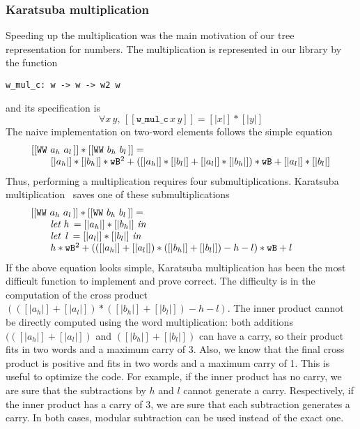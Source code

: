 \subsubsection{Karatsuba multiplication}
Speeding up the multiplication was the main motivation of our 
tree representation for numbers. The multiplication is represented in our library
by the function
\begin{verbatim}
w_mul_c: w -> w -> w2 w
\end{verbatim}
and its specification is
$$\forall x\, y,\, [[\texttt{w\_mul\_c}\, x\, y]] = [|x|] * [|y|]$$
The naive implementation on two-word elements follows the simple equation
$$\begin{array}{l}
[[\texttt{WW}\,\,a_h\,\,a_l\,]] * [[\texttt{WW}\,\,b_h\,\,b_l\,]] =\\
\hskip20pt [|{a_h}|] * [|{b_h}|] * {\texttt{wB}} ^ 2 +  ([|{a_h}|] * [|{b_l}|] + [|{a_l}|] * [|{b_h}|]) * {\texttt{wB}} + [|{a_l}|] * [|{b_l}|]
\end{array}
$$
Thus, performing a multiplication requires four submultiplications.
Karatsuba multiplication~\cite{Karat} saves one of these submultiplications
$$\begin{array}{l}
[[\texttt{WW}\,\,a_h\,\,a_l\,]] * [[\texttt{WW}\,\,b_h\,\,b_l\,]] = \\
\hskip20pt \textit{let}\,\, {h}\, = [|{a_h}|] * [|{b_h}|]\,\, \textit{in}\\
\hskip20pt \textit{let}\,\,\,  {l}\, = [|{a_l}|] * [|{b_l}|]\,\, \textit{in}\\
\hskip20pt {h} * {\texttt{wB}}^2 + (([|{a_h}|] + [|{a_l}|]) * ([|{b_h}|] + [|{b_l}|]) - {h} - {l}) * {\texttt{wB}} + {l} \qquad\qquad
\end{array}
$$
If the above equation looks simple,  Karatsuba multiplication has been the most difficult function 
to implement and prove correct.
The difficulty is in the computation of the cross
product $(([|{a_h}|] + [|{a_l}|]) * ([|{b_h}|] + [|{b_l}|]) - {h} - {l})$. 
The inner product cannot be directly computed using the word multiplication: 
both additions $(([|{a_h}|] + [|{a_l}|])$ and $([|{b_h}|] + [|{b_l}|])$ can have a carry, 
so their product fits in two words and a maximum carry of 3.
Also, we know that the final cross product is positive and fits in
two words and a maximum carry of 1. This is useful to optimize the code. For example, 
if the inner product has no carry, we are sure that the subtractions by $h$ and $l$ cannot 
generate a carry. Respectively, if the inner product has a carry of 3,  we are sure that each 
subtraction generates a carry. In both cases, modular subtraction can be used instead of
the exact one. 

